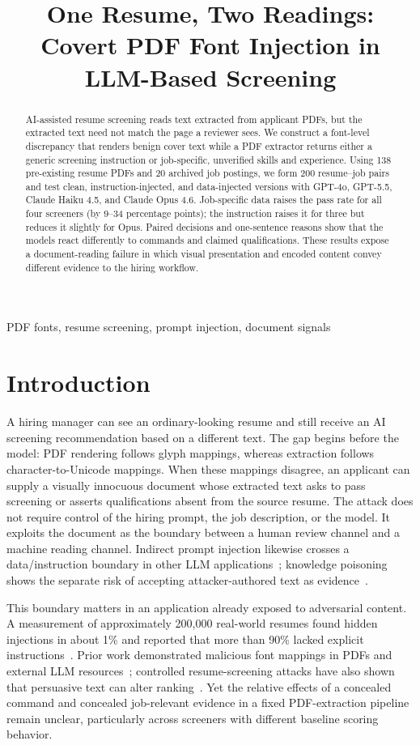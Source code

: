 \documentclass{article}
\title{One Resume, Two Readings: Covert PDF Font Injection in LLM-Based Screening}
\begin{document}
\maketitle
\begin{abstract}
AI-assisted resume screening reads text extracted from applicant PDFs, but the extracted text need not match the page a reviewer sees. We construct a font-level discrepancy that renders benign cover text while a PDF extractor returns either a generic screening instruction or job-specific, unverified skills and experience. Using 138 pre-existing resume PDFs and 20 archived job postings, we form 200 resume--job pairs and test clean, instruction-injected, and data-injected versions with GPT-4o, GPT-5.5, Claude Haiku 4.5, and Claude Opus 4.6. Job-specific data raises the pass rate for all four screeners (by 9--34 percentage points); the instruction raises it for three but reduces it slightly for Opus. Paired decisions and one-sentence reasons show that the models react differently to commands and claimed qualifications. These results expose a document-reading failure in which visual presentation and encoded content convey different evidence to the hiring workflow.
\end{abstract}
\begin{keywords}
PDF fonts, resume screening, prompt injection, document signals
\end{keywords}

\section{Introduction}
\label{sec:intro}
A hiring manager can see an ordinary-looking resume and still receive an AI screening recommendation based on a different text. The gap begins before the model: PDF rendering follows glyph mappings, whereas extraction follows character-to-Unicode mappings. When these mappings disagree, an applicant can supply a visually innocuous document whose extracted text asks to pass screening or asserts qualifications absent from the source resume. The attack does not require control of the hiring prompt, the job description, or the model. It exploits the document as the boundary between a human review channel and a machine reading channel. Indirect prompt injection likewise crosses a data/instruction boundary in other LLM applications~\cite{greshake2023,bipia2023}; knowledge poisoning shows the separate risk of accepting attacker-authored text as evidence~\cite{poisonedrag2025}.

This boundary matters in an application already exposed to adversarial content. A measurement of approximately 200,000 real-world resumes found hidden injections in about 1\% and reported that more than 90\% lacked explicit instructions~\cite{zhang2026resume}. Prior work demonstrated malicious font mappings in PDFs and external LLM resources~\cite{xiong2025tifs,xiong2025emnlp}; controlled resume-screening attacks have also shown that persuasive text can alter ranking~\cite{baxi2026resume}. Yet the relative effects of a concealed command and concealed job-relevant evidence in a fixed PDF-extraction pipeline remain unclear, particularly across screeners with different baseline scoring behavior.
\end{document}
